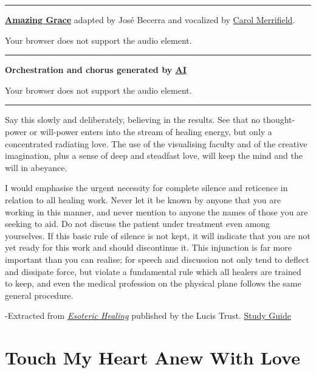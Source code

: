 \documentclass[
]{book}
\begin{document}
\begin{center}\rule{0.5\linewidth}{0.5pt}\end{center}

\textbf{\href{https://en.wikipedia.org/wiki/Amazing_Grace}{Amazing Grace}} adapted by José Becerra and vocalized by \href{https://open.spotify.com/playlist/37i9dQZF1E4xkOm8WMtIMe}{Carol Merrifield}.

Your browser does not support the audio element.

\begin{center}\rule{0.5\linewidth}{0.5pt}\end{center}

\textbf{Orchestration and chorus generated by \href{https://suno.com}{AI}}

Your browser does not support the audio element.

\begin{center}\rule{0.5\linewidth}{0.5pt}\end{center}

Say this slowly and deliberately, believing in the results. See that no thought-power or will-power enters into the stream of healing energy, but only a concentrated radiating love. The use of the visualising faculty and of the creative imagination, plus a sense of deep and steadfast love, will keep the mind and the will in abeyance.

I would emphasise the urgent necessity for complete silence and reticence in relation to all healing work. Never let it be known by anyone that you are working in this manner, and never mention to anyone the names of those you are seeking to aid. Do not discuss the patient under treatment even among yourselves. If this basic rule of silence is not kept, it will indicate that you are not yet ready for this work and should discontinue it. This injunction is far more important than you can realise; for speech and discussion not only tend to deflect and dissipate force, but violate a fundamental rule which all healers are trained to keep, and even the medical profession on the physical plane follows the same general procedure.

-Extracted from \emph{\href{https://www.lucistrust.org/online_books/esoteric_healing_obooks}{Esoteric Healing}} published by the Lucis Trust. \href{https://bookdown.org/becerra_je/Esoteric-Healing/}{Study Guide}

\hypertarget{touch-my-heart-anew-with-love}{%
\chapter{Touch My Heart Anew With Love}\label{touch-my-heart-anew-with-love}}
\end{document}
